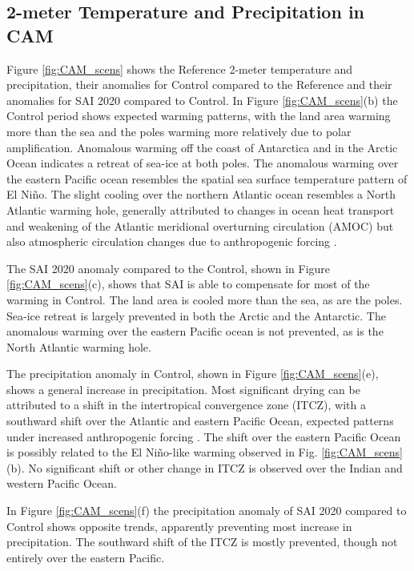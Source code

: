 \subsection{2-meter Temperature and Precipitation in CAM}
Figure \ref{fig:CAM_scens} shows the Reference 2-meter temperature and precipitation, their anomalies for Control compared to the Reference and their anomalies for SAI 2020 compared to Control. In Figure \ref{fig:CAM_scens}(b) the Control period shows expected warming patterns, with the land area warming more than the sea and the poles warming more relatively due to polar amplification. Anomalous warming off the coast of Antarctica and in the Arctic Ocean indicates a retreat of sea-ice at both poles. The anomalous warming over the eastern Pacific ocean resembles the spatial sea surface temperature pattern of El Ni\~no. The slight cooling over the northern Atlantic ocean resembles a North Atlantic warming hole, generally attributed to changes in ocean heat transport and weakening of the Atlantic meridional overturning circulation (AMOC) but also atmospheric circulation changes due to anthropogenic forcing \parencite{menary2018anatomy,he2022}. 

The SAI 2020 anomaly compared to the Control, shown in Figure \ref{fig:CAM_scens}(c), shows that SAI is able to compensate for most of the warming in Control. The land area is cooled more than the sea, as are the poles. Sea-ice retreat is largely prevented in both the Arctic and the Antarctic. The anomalous warming over the eastern Pacific ocean is not prevented, as is the North Atlantic warming hole. 

The precipitation anomaly in Control, shown in Figure \ref{fig:CAM_scens}(e), shows a general increase in precipitation. Most significant drying can be attributed to a shift in the intertropical convergence zone (ITCZ), with a southward shift over the Atlantic and eastern Pacific Ocean, expected patterns under increased anthropogenic forcing \parencite{mamalakis2021zonally}. The shift over the eastern Pacific Ocean is possibly related to the El Ni\~no-like warming observed in Fig. \ref{fig:CAM_scens}(b). No significant shift or other change in ITCZ is observed over the Indian and western Pacific Ocean.

In Figure \ref{fig:CAM_scens}(f) the precipitation anomaly of SAI 2020 compared to Control shows opposite trends, apparently preventing most increase in precipitation. The southward shift of the ITCZ is mostly prevented, though not entirely over the eastern Pacific.

